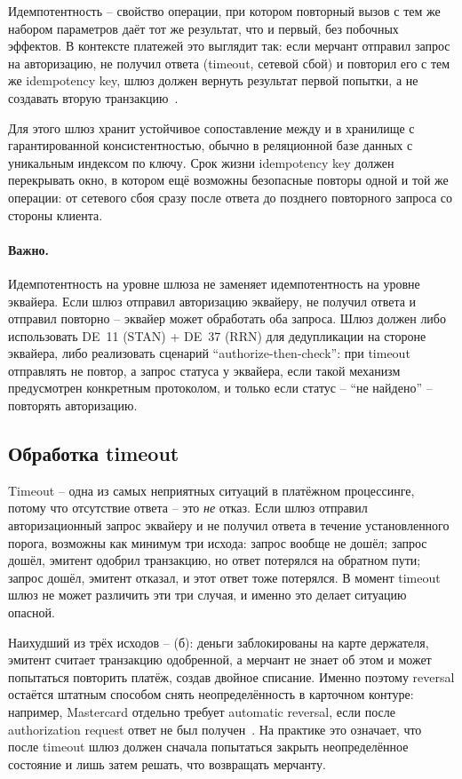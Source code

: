 Идемпотентность -- свойство операции, при котором повторный вызов
с тем же набором параметров даёт тот же результат, что и первый,
без побочных эффектов. В контексте платежей это выглядит так:
если мерчант отправил запрос на авторизацию, не получил ответа
(timeout, сетевой сбой) и повторил его с тем же idempotency key,
шлюз должен вернуть результат первой попытки, а не создавать
вторую транзакцию~\cite{stripe-idempotency}.

Для этого шлюз хранит устойчивое сопоставление между
 и 
в хранилище с гарантированной консистентностью, обычно
в реляционной базе данных с уникальным индексом по ключу.
Срок жизни idempotency key должен перекрывать окно, в котором
ещё возможны безопасные повторы одной и той же операции:
от сетевого сбоя сразу после ответа до позднего повторного
запроса со стороны клиента.

\paragraph{Важно.}
  Идемпотентность на уровне шлюза не заменяет идемпотентность
  на уровне эквайера. Если шлюз отправил авторизацию эквайеру,
  не получил ответа и отправил повторно -- эквайер может
  обработать оба запроса. Шлюз должен либо использовать
  DE~11 (STAN) + DE~37 (RRN) для дедупликации
  на стороне эквайера, либо реализовать сценарий
  \enquote{authorize-then-check}: при timeout отправлять не повтор,
  а запрос статуса у эквайера, если такой механизм предусмотрен
  конкретным протоколом,
  и только если статус -- \enquote{не найдено} -- повторять
  авторизацию.


\subsection*{Обработка timeout}

Timeout -- одна из самых неприятных ситуаций в платёжном
процессинге, потому что отсутствие ответа -- это \emph{не}
отказ. Если шлюз отправил авторизационный запрос эквайеру
и не получил ответа в течение установленного порога, возможны
как минимум три исхода: запрос вообще
не дошёл; запрос дошёл, эмитент одобрил транзакцию, но ответ
потерялся на обратном пути; запрос дошёл, эмитент отказал,
и этот ответ тоже потерялся. В момент timeout шлюз не может
различить эти три случая, и именно это делает ситуацию опасной.

Наихудший из трёх исходов -- (б): деньги заблокированы на карте
держателя, эмитент считает транзакцию одобренной, а мерчант
не знает об этом и может попытаться повторить платёж, создав
двойное списание. Именно поэтому reversal остаётся штатным
способом снять неопределённость в карточном контуре: например,
Mastercard отдельно требует automatic reversal,
если после authorization request ответ не был получен~\cite{mc-tpr}.
На практике это означает, что после timeout шлюз должен сначала
попытаться закрыть неопределённое состояние и лишь затем
решать, что возвращать мерчанту.

